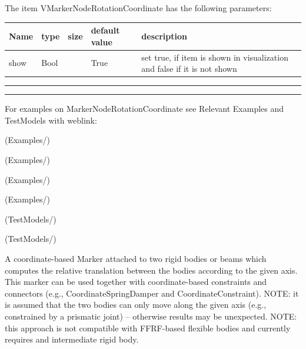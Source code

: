 \noindent The item VMarkerNodeRotationCoordinate has the following parameters:
\begin{center}
  \footnotesize
  \begin{longtable}{| p{4.5cm} | p{2.5cm} | p{0.5cm} | p{2.5cm} | p{6cm} |}
    \hline
    \bf Name & \bf type & \bf size & \bf default value & \bf description \\ \hline
    show &     Bool &      &     True &     set true, if item is shown in visualization and false if it is not shown\\ \hline
\end{longtable}
\end{center}
\par\noindent\rule{\textwidth}{0.4pt}
\label{description_MarkerNodeRotationCoordinate}
\vspace{6pt}\par\noindent\rule{\textwidth}{0.4pt}
%
\noindent For examples on MarkerNodeRotationCoordinate see Relevant Examples and TestModels with weblink:
\bi
\item {} (Examples/)
\item {} (Examples/)
\item {} (Examples/)
\item {} (Examples/)
\item {} (TestModels/)
\item {} (TestModels/)

\ei

%
\newpage


\label{sec:item:MarkerBodiesRelativeTranslationCoordinate}
A coordinate-based Marker attached to two rigid bodies or beams which computes the relative translation between the bodies according to the given axis. This marker can be used together with coordinate-based constraints and connectors (e.g., CoordinateSpringDamper and CoordinateConstraint). NOTE: it is assumed that the two bodies can only move along the given axis (e.g., constrained by a prismatic joint) -- otherwise results may be unexpected. NOTE: this approach is not compatible with FFRF-based flexible bodies and currently requires and intermediate rigid body.
\vspace{12pt}\\


